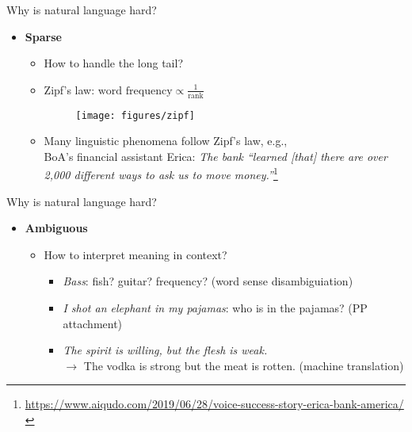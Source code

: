 \documentclass[usenames,dvipsnames,notes,11pt,aspectratio=169]{beamer}
\begin{document}
\begin{frame}
    {Why is natural language hard?}
    \begin{itemize}
        \item \textbf{Sparse} 
            \begin{itemize}
                \item How to handle the long tail?
                \item Zipf's law: $\text{word frequency} \propto \frac{1}{\text{rank}}$
                    \begin{figure}
                        \texttt{[image: figures/zipf]}
                    \end{figure}
                \item Many linguistic phenomena follow Zipf's law, e.g.,\\
                    BoA's financial assistant Erica:
                    \textit{The bank ``learned [that] there are over 2,000 different ways to ask us to move money.''}\footnote[frame]{
                        \url{https://www.aiqudo.com/2019/06/28/voice-success-story-erica-bank-america/}
                    }
            \end{itemize}
    \end{itemize}
\end{frame}

\begin{frame}
    {Why is natural language hard?}
    \begin{itemize}
        \item \textbf{Ambiguous} 
            \begin{itemize}
                \item How to interpret meaning in context?
                \medskip
                \begin{itemize}
                    \itemsep2em
                    \item[] {\it Bass}: fish? guitar? frequency? (word sense disambiguiation)
                    \item[] {\it I shot an elephant in my pajamas}: who is in the pajamas? (PP attachment)
                    \item[] {\it The spirit is willing, but the flesh is weak.}\\
                        $\rightarrow$ 
                        The vodka is strong but the meat is rotten. (machine translation)
                \end{itemize}
            \end{itemize}
    \end{itemize}
\end{frame}
\end{document}
